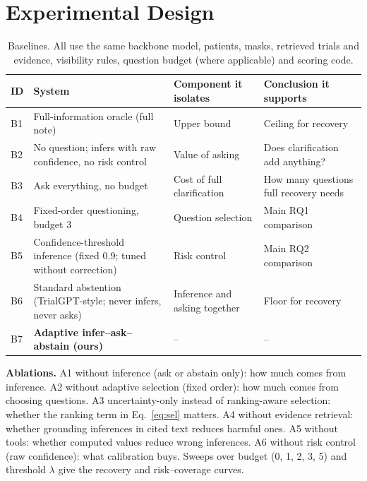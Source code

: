 \documentclass[10pt,a4paper]{article}
\begin{document}
\section{Experimental Design}
\begin{table}[H]
\centering\footnotesize
\begin{tabularx}{\textwidth}{@{}P{0.6cm}P{4.6cm}P{4.3cm}L@{}}
\toprule
\textbf{ID} & \textbf{System} & \textbf{Component it isolates} & \textbf{Conclusion it supports}\\
\midrule
B1 & Full-information oracle (full note) & Upper bound & Ceiling for recovery\\
B2 & No question; infers with raw confidence, no risk control & Value of asking & Does clarification add anything?\\
B3 & Ask everything, no budget & Cost of full clarification & How many questions full recovery needs\\
B4 & Fixed-order questioning, budget 3 & Question selection & Main RQ1 comparison\\
B5 & Confidence-threshold inference (fixed 0.9; tuned without correction) & Risk control & Main RQ2 comparison\\
B6 & Standard abstention (TrialGPT-style; never infers, never asks) & Inference and asking together & Floor for recovery\\
B7 & \textbf{Adaptive infer--ask--abstain (ours)} & -- & --\\
\bottomrule
\end{tabularx}
\caption{Baselines. All use the same backbone model, patients, masks, retrieved trials and evidence, visibility rules, question budget (where applicable) and scoring code.}
\end{table}

\textbf{Ablations.} A1 without inference (ask or abstain only): how much comes from inference. A2 without adaptive selection (fixed order): how much comes from choosing questions. A3 uncertainty-only instead of ranking-aware selection: whether the ranking term in Eq.~\ref{eq:sel} matters. A4 without evidence retrieval: whether grounding inferences in cited text reduces harmful ones. A5 without tools: whether computed values reduce wrong inferences. A6 without risk control (raw confidence): what calibration buys. Sweeps over budget (0, 1, 2, 3, 5) and threshold \(\lambda\) give the recovery and risk--coverage curves.
\end{document}
